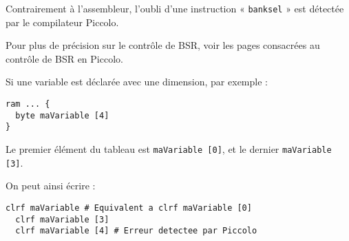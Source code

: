 Contrairement à l'assembleur, l'oubli d'une instruction « \texttt{banksel} » est détectée par le compilateur Piccolo.

Pour plus de précision sur le contrôle de BSR, voir les pages consacrées au contrôle de BSR en Piccolo.

Si une variable est déclarée avec une dimension, par exemple :
\begin{lstlisting}[language=piccolo]
ram ... { 
  byte maVariable [4]
}
\end{lstlisting}

Le premier élément du tableau est \texttt{maVariable [0]}, et le dernier  \texttt{maVariable [3]}.

On peut ainsi écrire :
\begin{lstlisting}[language=piccolo]
  clrf maVariable # Equivalent a clrf maVariable [0]
  clrf maVariable [3]
  clrf maVariable [4] # Erreur detectee par Piccolo
\end{lstlisting}


